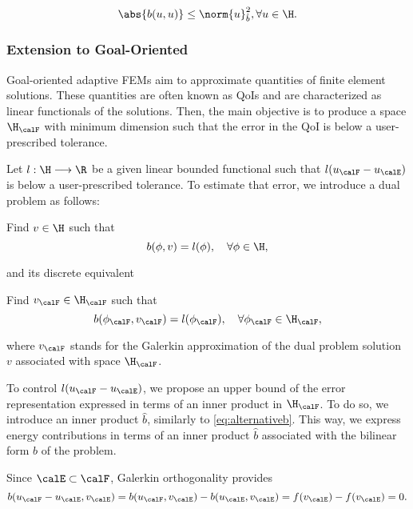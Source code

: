 \begin{equation}
  \label{eq:alternativeb}
  \abs{b(u,u)} \leq \norm{u}_{\hat{b}}^2, \forall u \in \H.
\end{equation}

\subsubsection{Extension to Goal-Oriented}
Goal-oriented adaptive \acp{FEM} aim to approximate quantities of finite element solutions. These quantities are often known as \acp{QoI} and are characterized as linear functionals of the solutions. Then, the main objective is to produce a space $\H_{\calF}$ with minimum dimension such that the error in the \ac{QoI} is below a user-prescribed tolerance.

Let $l: \H \longrightarrow \R$ be a given linear bounded functional such that $l(u_{\calF} - u_{\calE})$ is below a user-prescribed tolerance. To estimate that error, we introduce a dual problem \cite{prudhomme1999goal,oden2001goal} as follows:
\begin{var_for}
  Find $v \in \H$ such that
  \begin{equation}
    \label{eq:adjoint}
    b(\phi,v)=l(\phi), \quad \forall \phi\in \H,
  \end{equation}
\end{var_for}
\noindent and its discrete equivalent
\begin{var_for}
  Find $v_{\calF}\in \H_{\calF}$ such that
  \begin{equation}
    \label{eq:adjointH}
    b(\phi_{\calF},v_{\calF})=l(\phi_{\calF}), \quad \forall \phi_{\calF} \in \H_{\calF},
  \end{equation}
\end{var_for}
\noindent  where $v_{\calF}$ stands for the Galerkin approximation of the dual problem solution $v$ associated with space $\H_{\calF}$.

To control $l(u_{\calF} - u_{\calE})$, we propose an upper bound of the error representation expressed in terms of an inner product in $\H_{\calF}$. To do so, we introduce an inner product $\hat{b}$, similarly to \cref{eq:alternativeb}. This way, we express energy contributions in terms of an inner product $\hat{b}$ associated with the bilinear form $b$ of the problem.

Since $\calE \subset \calF$, Galerkin orthogonality provides
\begin{equation}
  b(u_{\calF} - u_{\calE},v_{\calE})=b(u_{\calF},v_{\calE})-b(u_{\calE},v_{\calE})=f(v_{\calE})-f(v_{\calE})=0.
\end{equation}

